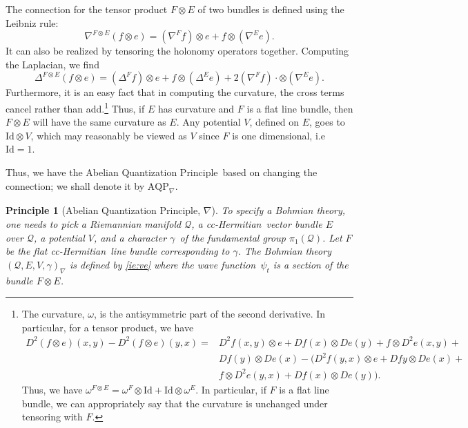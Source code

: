 \documentclass[11pt]{article}
\newtheorem{principle}{Principle}
\theoremstyle{remark}
\begin{document}
The connection for the tensor product $F \otimes
E$ of two bundles is defined using the Leibniz rule:
\begin{equation*} \nabla^{F\otimes E}( f \otimes e) = (\nabla^F f)
\otimes e + f 
\otimes (\nabla^E  e).
\end{equation*} 
It can also be realized by tensoring the holonomy operators together.
Computing the  Laplacian,  we find  
\begin{equation*} 
\ensuremath{\Delta}^{F\otimes E} (f \otimes e) = (\ensuremath{\Delta}^F f) \otimes e + f \otimes (\ensuremath{\Delta}^E
e) + 2 (\nabla^F f) \cdot \otimes (\nabla^E e).
\end{equation*} 
Furthermore, 
it is an easy
fact that  in
computing the 
curvature, the cross terms cancel rather than add.\footnote{The
curvature, $\omega$,  is the antisymmetric part of the second derivative. In
particular, for a tensor product, we have
 \[\begin{split}  
D^2 (f\otimes e) (x, y) - D^2(f \otimes e)(y,x) = & D^2f(x,y) \otimes
e + Df(x) \otimes De(y) + f \otimes D^2e(x,y) + \\ &Df(y) \otimes
De(x)  
- (D^2f(y,x) \otimes
e + 
Dfy \otimes De(x) + \\
&f \otimes D^2e(y,x) + Df(x) \otimes
De(y) ). \end{split} \]
Thus, we have $\omega^{F \otimes E} = \omega^{F} \otimes \mathrm{Id}
+ \mathrm{Id} \otimes \omega^{E} $. In particular, if $F$ is a flat
line bundle, we can appropriately say that the curvature is unchanged
under tensoring with $F$. }
Thus, if $E$ has
curvature and $F$ is a flat line bundle,
 then $F \otimes E$ will have the same
curvature as $E$. Any potential $V$, defined on $E$, goes to
$\mathrm{Id} \otimes V$, which may reasonably be viewed as $V$ since
$F$ is one dimensional, i.e $\mathrm{Id} = 1$. 


Thus, we have the Abelian Quantization Principle\ based on changing the connection; we shall
denote it by \ensuremath{\text{AQP}_{\nabla}}.
\begin{principle}[Abelian Quantization Principle, $\nabla$]
To specify a Bohmian theory, one needs to pick a Riemannian manifold
 $\ensuremath{\mathcal{Q}}$, a 
 cc-Hermitian\ vector bundle $E$ over
 \ensuremath{\mathcal{Q}}, a potential $V$, and a character \ensuremath{\gamma}\
 of the fundamental group \ensuremath{\pi_1 ({\ensuremath{\mathcal{Q}}})}.
Let $F$ be the flat
 cc-Hermitian\ line bundle corresponding to \ensuremath{\gamma}. The Bohmian
 theory $(\ensuremath{\mathcal{Q}}, E, V, \ensuremath{\gamma})_{\nabla}$ is defined by 
\eqref{ie:ve}
where  the wave function\
$\ensuremath{\psi}_t$ is a section of the bundle $F\otimes E$. 
\end{principle}
\end{document}
